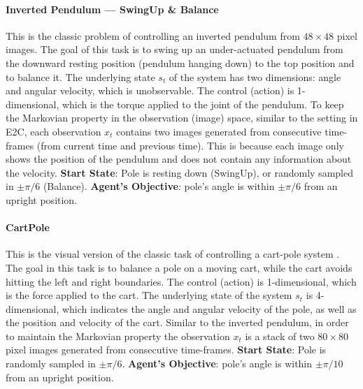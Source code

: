 \documentclass{article} %
\begin{document}
\paragraph{Inverted Pendulum — SwingUp \& Balance} 
This is the classic problem of controlling an inverted pendulum \citep{furuta1991swingup} from $48 \times 48$ pixel images. The goal of this task is to swing up an under-actuated pendulum from the downward resting position (pendulum hanging down) to the top position and to balance it. The underlying state $s_t$ of the system has two dimensions: angle and angular velocity, which is unobservable. The control (action) is 1-dimensional, which is the torque applied to the joint of the pendulum. To keep the Markovian property in the observation (image) space, similar to the setting in E2C, each observation $x_t$ contains two images generated from consecutive time-frames (from current time and previous time). This is because each image only shows the position of the pendulum and does not contain any information about the velocity. \textbf{Start State}: Pole is resting down (SwingUp), or randomly sampled in $\pm \pi/6$ (Balance). \textbf{Agent’s Objective}: pole’s angle is within $\pm \pi/6$ from an upright position.

\paragraph{CartPole} 
This is the visual version of the classic task of controlling a cart-pole system \citep{geva1993cartpole}. The goal in this task is to balance a pole on a moving cart, while the cart avoids hitting the left and right boundaries. The control (action) is 1-dimensional, which is the force applied to the cart. The underlying state of the system $s_t$ is 4-dimensional, which indicates the angle and angular velocity of the pole, as well as the position and velocity of the cart. Similar to the inverted pendulum, in order to maintain the Markovian property the observation $x_t$ is a stack of two $80 \times 80$ pixel images generated from consecutive time-frames. \textbf{Start State}: Pole is randomly sampled in $\pm \pi/6$. \textbf{Agent’s Objective}: pole’s angle is within $\pm \pi/10$ from an upright position.
\end{document}
